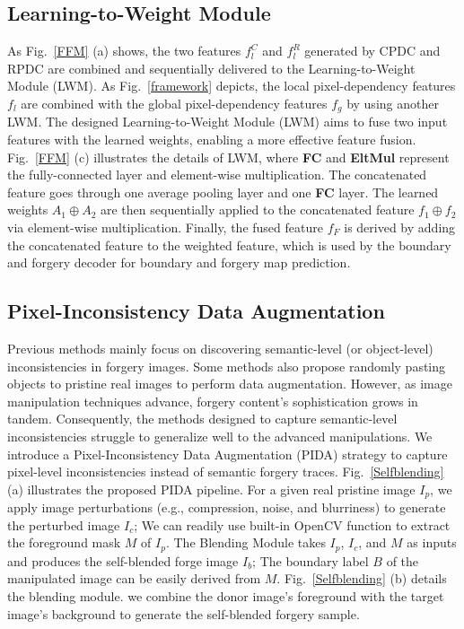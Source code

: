\documentclass[10pt,journal,compsoc]{IEEEtran}
\begin{document}
\subsection{Learning-to-Weight Module}
As Fig.~\ref{FFM} (a) shows, the two features $f_{l}^{C}$ and $f_{l}^{R}$ generated by CPDC and RPDC are combined and sequentially delivered to the Learning-to-Weight Module (LWM). As Fig.~\ref{framework} depicts, the local pixel-dependency features $f_{l}$ are combined with the global pixel-dependency features $f_{g}$ by using another LWM. The designed Learning-to-Weight Module (LWM) aims to fuse two input features with the learned weights, enabling a more effective feature fusion. Fig.~\ref{FFM} (c) illustrates the details of LWM, where \textbf{FC} and \textbf{EltMul} represent the fully-connected layer and element-wise multiplication. The concatenated feature goes through one average pooling layer and one \textbf{FC} layer. The learned weights $A_{1}\oplus A_{2}$ are then sequentially applied to the concatenated feature $f_{1}\oplus f_{2}$ via element-wise multiplication. Finally, the fused feature $f_{F}$ is derived by adding the concatenated feature to the weighted feature, which is  used by the boundary and forgery decoder for boundary and forgery map prediction.  



\subsection{Pixel-Inconsistency Data Augmentation}
Previous methods \cite{wang2022objectformer} mainly focus on discovering semantic-level (or object-level) inconsistencies in forgery images. Some methods \cite{dong2022mvss, zhuang2021image} also propose randomly pasting objects to pristine real images to perform data augmentation. However, as image manipulation techniques advance, forgery content's sophistication grows in tandem. Consequently, the methods designed to capture semantic-level inconsistencies struggle to generalize well to the advanced manipulations. We introduce a Pixel-Inconsistency Data Augmentation (PIDA) strategy to capture pixel-level inconsistencies instead of semantic forgery traces. Fig.~\ref{Selfblending} (a) illustrates the proposed PIDA pipeline.  For a given real pristine image $I_{p}$, we apply image perturbations (e.g., compression, noise, and blurriness) to generate the perturbed image $I_{c}$;  We can readily use built-in OpenCV function to extract the foreground mask $M$ of $I_{p}$. The Blending Module takes $I_{p}$, $I_{c}$, and $M$ as inputs and produces the self-blended forge image $I_{b}$;  The boundary label $B$ of the manipulated image can be easily derived from $M$. Fig.~\ref{Selfblending} (b) details the blending module. we combine the donor image's foreground with the target image's background to generate the self-blended forgery sample.
\end{document}
